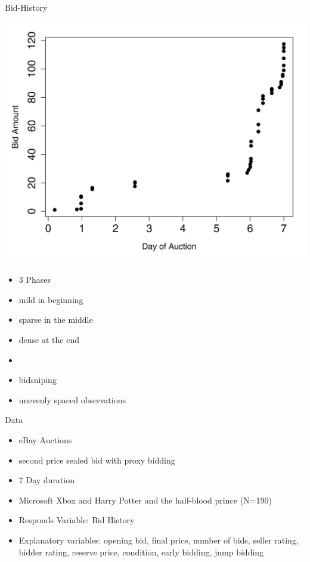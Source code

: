 \documentclass[hyperref={pdfpagelabels=false}]{beamer}
\begin{document}
\begin{frame}{Bid-History}
\begin{minipage}[c]{0.65\textwidth}
\includegraphics[width=\textwidth]{bid_history.JPG}
\end{minipage}
\hfill
\begin{minipage}[c]{0.3\textwidth}
\begin{itemize}
\item[] 3 Phases
\item mild in beginning
\item sparse in the middle
\item dense at the end
\end{itemize}
\begin{itemize}
\item[] 
\item bidsniping
\item unevenly spaced observations
\end{itemize}
\end{minipage}
\end{frame}

\begin{frame}{Data}
\begin{itemize}
    \item eBay Auctions
    \item second price sealed bid with proxy bidding
    \item 7 Day duration
    \item Microsoft Xbox and Harry Potter and the half-blood prince (N=190)
    \item Responds Variable: Bid History
    \item Explanatory variables: opening bid, final price, number of bids, seller rating, bidder rating, reserve price, condition, early bidding, jump bidding
\end{itemize}
\end{frame}
\end{document}
